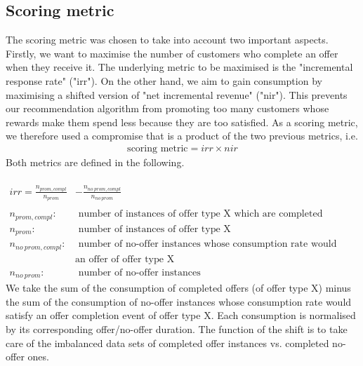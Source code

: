 \documentclass[11pt]{article} %
\begin{document}
\subsection{Scoring metric}
The scoring metric was chosen to take into account two important aspects.
Firstly, we want to maximise the number of customers who complete an offer when they receive it. The underlying metric to be maximised is the "incremental response rate" ("irr").
On the other hand, we aim to gain consumption by maximising a shifted version of "net incremental revenue" ("nir").
This prevents our recommendation algorithm from promoting too many customers whose rewards make them spend less because they are too satisfied.
As a scoring metric, we therefore used a compromise that is a product of the two previous metrics, i.e.
\begin{align}
\text{scoring metric}= irr \times nir
\end{align}
Both metrics are defined in the following.
%
\\
\\
\begin{align}
irr=\frac{ n_{prom,compl} }{ n_{prom}} &-\frac{ n_{no\ prom,compl} }{ n_{no\ prom}}
\\
\nonumber\\
n_{prom,compl}:& \text{\ number of instances of offer type X which are completed}\nonumber
\\
n_{prom}:& \text{\ number of instances of offer type X}\nonumber
\\
n_{no\ prom,compl}:& \text{\ number of no-offer instances whose consumption rate would have completed}\nonumber
\\
& \text{an offer of offer type X}\nonumber
\\
n_{no\ prom}:& \text{\ number of no-offer instances}\nonumber
\end{align}
We take the sum of the consumption of completed offers (of offer type X) minus the sum of the consumption of no-offer instances whose consumption rate would satisfy an offer completion event of offer type X.
Each consumption is normalised by its corresponding offer/no-offer duration. The function of the shift is to take care of the imbalanced data sets of completed offer instances vs. completed no-offer ones.
\end{document}
